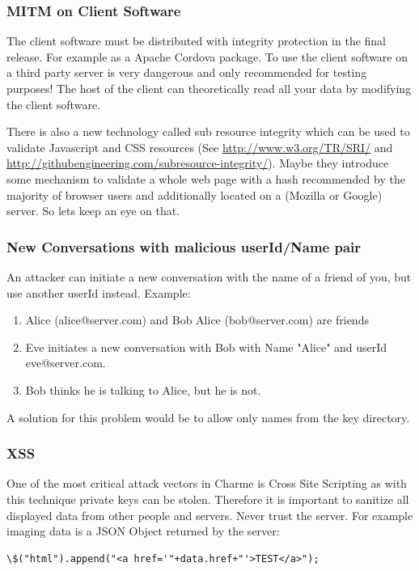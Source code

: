 \documentclass{scrartcl}
\begin{document}
   

  \subsubsection{MITM on Client Software}
  The client software must be distributed with integrity protection in the final release. For example as a Apache Cordova package. To use the client software on a third party server is very dangerous and only recommended for testing purposes! The host of the client can theoretically read all your data by modifying the client software.
  
   There is also a new technology called sub resource integrity which can be used to validate Javascript and CSS resources (See \url{http://www.w3.org/TR/SRI/} and \url{http://githubengineering.com/subresource-integrity/}). Maybe they introduce some mechanism to validate a whole web page with a hash recommended by the majority of browser users and additionally located on a (Mozilla or Google) server. So lets keep an eye on that.


   
     \subsubsection{New Conversations with malicious userId/Name pair }
     An attacker can initiate a new conversation with the name of a friend of you, but use another userId instead. Example:
      \begin{enumerate}
     \item Alice (alice@server.com) and Bob Alice (bob@server.com) are friends
     \item Eve initiates a new conversation with Bob with Name "Alice" and userId eve@server.com. 
     \item Bob thinks he is talking to Alice, but he is not.
     \end{enumerate}
     A solution for this problem would be to allow only names from the key directory.
   \subsubsection{XSS}
   One of the most critical attack vectors in Charme is Cross Site Scripting as with this technique private keys can be stolen.
   Therefore it is important to sanitize all displayed data from other people and servers. Never trust the server. For example imaging data is a JSON Object returned by the server:
   
       \begin{lstlisting}
\$("html").append("<a href='"+data.href+"'>TEST</a>");
    \end{lstlisting}
    
\end{document}
